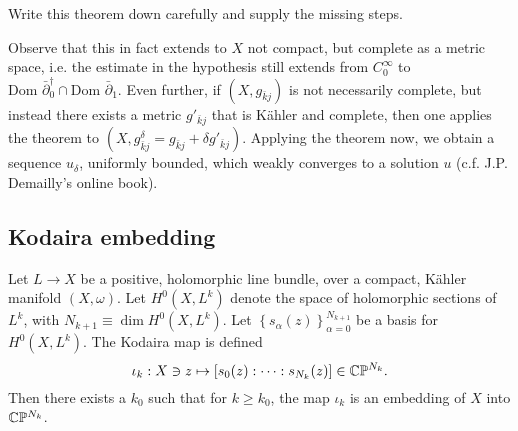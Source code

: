 \documentclass{../mathnotes}
\begin{document}
\begin{exc}
    Write this theorem down carefully and supply the missing steps.
\end{exc}

Observe that this in fact extends to $X$ not compact, but complete as a metric space, i.e.
the estimate in the hypothesis still extends from $C^\infty_0$ to $\text{Dom }\bar\partial_0^\dagger\cap\text{Dom }\bar\partial_1$.
Even further, if $(X,g_{\bar kj})$ is not necessarily complete, but instead there exists a metric $g'_{\bar kj}$ that is K\"ahler
and complete, then one applies the theorem to $(X,g^\delta_{\bar kj}=g_{\bar kj}+\delta g'_{\bar kj}).$ Applying the theorem
now, we obtain a sequence $u_\delta$, uniformly bounded, which weakly converges to a solution $u$ (c.f. J.P. Demailly's online
book).


\subsection{Kodaira embedding}

\begin{thm}
    Let $L\to X$ be a positive, holomorphic line bundle, over a compact, K\"ahler  manifold $(X,\omega)$. 
    Let $H^0(X,L^k)$ denote the space of holomorphic sections of $L^k$, with $N_{k+1}\equiv\dim H^0(X,L^k)$.
    Let $\left\{ s_\alpha(z) \right\}_{\alpha=0}^{N_{k+1}}$ be a basis for $H^0(X,L^k)$. The Kodaira map is
    defined
    \[\iota_k: X\ni z \mapsto [s_0(z):\cdots:s_{N_k}(z)]\in\mathbb{C}\mathbb{P}^{N_k}.\]
    Then there exists a $k_0$ such that for $k\geq k_0$, the map $\iota_k$ is an embedding of $X$
    into $\mathbb{C}\mathbb{P}^{N_k}$.
\end{thm}
\end{document}
